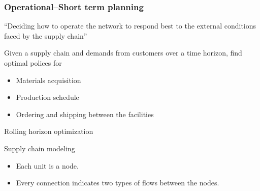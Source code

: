 \documentclass[table]{beamer}
\begin{document}
\begin{frame}
  \frametitle{Operational--Short term planning}
\alert{``Deciding how to operate the network to respond best to the
    external conditions faced by the supply chain''}

Given a \alert{supply chain} and  \alert{demands} from customers
    over a time horizon, \alert{find optimal polices} for 
    \begin{itemize}
      \item  Materials acquisition
      \item  Production schedule
      \item  Ordering and shipping between the facilities
    \end{itemize}
{\color{blue}{Tailor Model Predictive Control (MPC) for short term
    planning}}
\end{frame}  



\begin{frame}{Rolling horizon optimization}
\begin{overprint}
  \begin{figure}
    \centering
    \huge{\resizebox{1\textwidth}{!}{}}
  \end{figure}
\begin{figure}
    \centering
    \huge{\resizebox{1\textwidth}{!}{}}
  \end{figure}
\begin{figure}
    \centering
    \huge{\resizebox{1\textwidth}{!}{}}
  \end{figure}
\end{overprint}
\end{frame}

{
\begin{frame}{Supply chain modeling}
 \begin{figure}
  \centering
  \huge{\resizebox{0.7\textwidth}{!}{}}
 \end{figure}
 \begin{itemize}
  \item Each unit is a node.
  \item Every connection indicates two types of flows between the
     nodes. 
 \end{itemize}
\end{frame}
}
\end{document}
